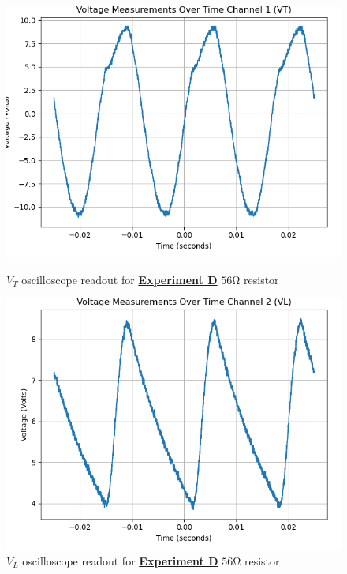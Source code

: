 \documentclass[
	letterpaper
	12pt
]{template}
\newcommand{\bref}[2]{\textbf{\hyperref[#1]{#2}}}
\begin{document}
\begin{figure}[H]\label{data::D3}
	\centering
	\begin{minipage}[c]{0.45\textwidth}
		\centering
		\includegraphics[width=\textwidth]{figures/D/3--ch1.png}
	    \caption{$V_{T}$ oscilloscope readout for \bref{exp::D}{Experiment D} $56\unit{\ohm}$ resistor}
	\end{minipage}
	\hfill
	\begin{minipage}[c]{0.45\textwidth}
		\centering
		\includegraphics[width=\textwidth]{figures/D/3--ch2.png}
	    \caption{$V_{L}$ oscilloscope readout for \bref{exp::D}{Experiment D} $56\unit{\ohm}$ resistor}
	\end{minipage}
\end{figure}
\end{document}
